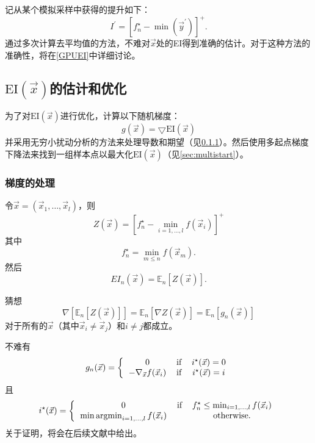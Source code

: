 \documentclass[index]{subfiles}
\begin{document}
记从某个模拟采样中获得的提升如下：
\begin{equation}
    I^{\prime} = \left[f_{n}^{\star} - \min(\vec{y}^{\prime})\right]^{+}.
\end{equation}
通过多次计算去平均值的方法，不难对$\vec{x}$处的EI得到准确的估计。对于这种方法的准确性，将在\cref{GPUEI}中详细讨论。

\subsection{$\mbox{EI}(\vec{x})$的估计和优化}

为了对$\mbox{EI}(\vec{x})$进行优化，计算以下随机梯度：
\begin{equation}
 g(\vec{x}) = \bigtriangledown \mbox{EI}(\vec{x})
\end{equation}
并采用无穷小扰动分析\cite{Fu1994}的方法来处理导数和期望（见\cref{EPI_proof}）。然后使用多起点梯度下降法来找到一组样本点以最大化$\mbox{EI}(\vec{x})$（见\cref{sec:multistart}）。

\subsubsection{梯度的处理}
\label{EPI_proof}

令$\vec{x} = \left(\vec{x}_{1}, \ldots, \vec{x}_{l}\right)$，则
\begin{equation}
    Z \left(\vec{x}\right) = \left[f_{n}^{\star} - \min_{i = 1,\ldots,l} f \left(\vec{x}_{i}\right)\right]^{+}
\end{equation}
其中
\begin{equation}
    f_{n}^{\star} = \min_{m\leq n} f \left(\vec{x}_{m}\right).
\end{equation}
然后
\begin{equation}
    EI_{n}(\vec{x}) = \mathbb{E}_{n}\left[Z \left(\vec{x}\right)\right].
\end{equation}

猜想
\begin{equation}
    \nabla \left[\mathbb{E}_{n}\left[Z \left(\vec{x}\right)\right]\right] = \mathbb{E}_{n}\left[\nabla Z \left(\vec{x}\right)\right] =  \mathbb{E}_{n}\left[g_{n}(\vec{x})\right]
\end{equation}
对于所有的$\vec{x}$（其中$\vec{x}_{i} \neq \vec{x}_{j}$）和$i \neq j$都成立。

不难有
\begin{equation}
    g_{n}(\vec{x}) = \left\{ \begin{tabular}{ccc}
        0 & if & $i^{\star}(\vec{x}) = 0$ \\
        $-\nabla_{\vec{x}} f(\vec{x}_{i})$ & if & $i^{\star}(\vec{x}) = i$
    \end{tabular} \right.
\end{equation}
且
\begin{equation}
    i^{\star}(\vec{x}) = \left\{ \begin{tabular}{ccc}
        0 & if & $f_{n}^{\star} \leq \min_{i=1,\ldots,l} f(\vec{x}_{i})$ \\
        $\min \argmin_{i=1,\ldots,l} f(\vec{x}_{i})$ & & otherwise.
    \end{tabular} \right.
\end{equation}
关于证明，将会在后续文献中给出。
\end{document}
